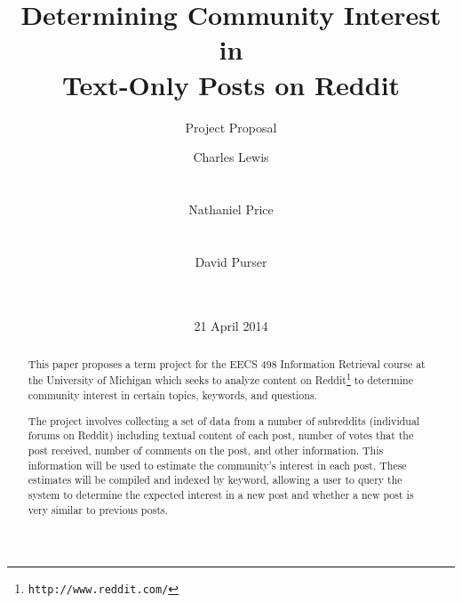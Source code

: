 \documentclass{acm_proc_article-sp}
\begin{document}
\title{Determining Community Interest in\\Text-Only Posts on Reddit}
\subtitle{Project Proposal}

%
%
%


\author{
%
%
\alignauthor
Charles Lewis\\
       \\
       \\
\alignauthor
Nathaniel Price\\
       \\
       \\
\alignauthor
David Purser\\
       \\
       \\
}

\date{21 April 2014}

\maketitle
\begin{abstract}
This paper proposes a term project for the EECS 498 Information Retrieval
course at the University of Michigan which seeks to analyze content on 
Reddit\footnote{\texttt{http://www.reddit.com/}} to determine community
interest in certain topics, keywords, and questions.

The project involves collecting a set of data from a number of subreddits
(individual forums on Reddit) including textual content of each post,
number of votes that the post received, number of comments on the post, and
other information.  This information will be used to estimate the community's
interest in each post.  These estimates will be compiled and indexed by keyword,
allowing a user to query the system to determine the expected interest in a
new post and whether a new post is very similar to previous posts.
\end{abstract}
\end{document}
